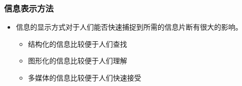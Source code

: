 \documentclass{beamer}
\begin{document}
\begin{frame}
	\frametitle{信息表示方法}
	\beamertemplatetransparentcovereddynamicmedium 
	\begin{itemize}
		\item 信息的显示方式对于人们能否快速捕捉到所需的信息片断有很大的影响。\pause
		\begin{itemize}
			\item 结构化的信息比较便于人们查找
			\item 图形化的信息比较便于人们理解
			\item 多媒体的信息比较便于人们快速接受
		\end{itemize}	
	\end{itemize}
\end{frame}

{
\frame[plain]{\transdissolve}
}

{
\frame[plain]{\transdissolve}
}
\end{document}
